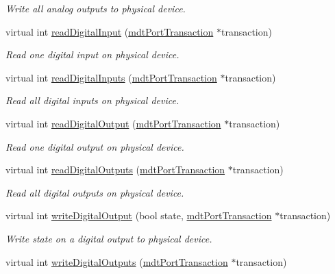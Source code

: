 \begin{DoxyCompactItemize}
\begin{DoxyCompactList}\small\item\em Write all analog outputs to physical device. \end{DoxyCompactList}\item 
virtual int \hyperlink{classmdt_device_af128b606050035abaf8d049bb2227015}{readDigitalInput} (\hyperlink{classmdt_port_transaction}{mdtPortTransaction} $\ast$transaction)
\begin{DoxyCompactList}\small\item\em Read one digital input on physical device. \end{DoxyCompactList}\item 
virtual int \hyperlink{classmdt_device_a150e3abae6db5bf1ad11017bf2b76c14}{readDigitalInputs} (\hyperlink{classmdt_port_transaction}{mdtPortTransaction} $\ast$transaction)
\begin{DoxyCompactList}\small\item\em Read all digital inputs on physical device. \end{DoxyCompactList}\item 
virtual int \hyperlink{classmdt_device_a1faee6ab31b094731211ea0943544501}{readDigitalOutput} (\hyperlink{classmdt_port_transaction}{mdtPortTransaction} $\ast$transaction)
\begin{DoxyCompactList}\small\item\em Read one digital output on physical device. \end{DoxyCompactList}\item 
virtual int \hyperlink{classmdt_device_aac038c24c3b91757584bdf0d09fb8b02}{readDigitalOutputs} (\hyperlink{classmdt_port_transaction}{mdtPortTransaction} $\ast$transaction)
\begin{DoxyCompactList}\small\item\em Read all digital outputs on physical device. \end{DoxyCompactList}\item 
virtual int \hyperlink{classmdt_device_a0fbe57503d86554829e708b2b83d73f1}{writeDigitalOutput} (bool state, \hyperlink{classmdt_port_transaction}{mdtPortTransaction} $\ast$transaction)
\begin{DoxyCompactList}\small\item\em Write state on a digital output to physical device. \end{DoxyCompactList}\item 
virtual int \hyperlink{classmdt_device_aa9e8ae7b4ff2455b4105d280d8523fc1}{writeDigitalOutputs} (\hyperlink{classmdt_port_transaction}{mdtPortTransaction} $\ast$transaction)

\end{DoxyCompactItemize}
